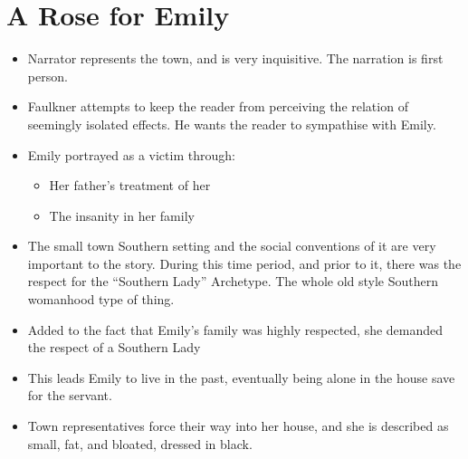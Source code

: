 \documentclass[11pt]{article}
\begin{document}
\section{A Rose for Emily}
\begin{itemize}
	\item Narrator represents the town, and is very inquisitive.  The narration is
		first person.
	\item Faulkner attempts to keep the reader from perceiving the relation of 
		seemingly isolated effects.  He wants the reader to sympathise with Emily.
	\item Emily portrayed as a victim through:
		\begin{itemize}
			\item Her father's treatment of her
			\item The insanity in her family
		\end{itemize}
	\item The small town Southern setting and the social conventions of it are 
		very important to the story.  During this time period, and prior to it,
		there was the respect for the ``Southern Lady'' Archetype.  The whole old
		style Southern womanhood type of thing.
	\item Added to the fact that Emily's family was highly respected, she demanded
		the respect of a Southern Lady
	\item This leads Emily to live in the past, eventually being alone in the 
		house	save for the servant.
	\item Town representatives force their way into her house, and she is
		described as small, fat, and bloated, dressed in black.
\end{itemize}
\end{document}
